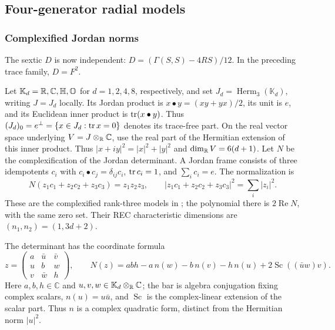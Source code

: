 \subsection{Four-generator radial models}
\label{sec:exceptional-four-generator}

\subsubsection{Complexified Jordan norms}
\label{exc-jordan-models}

The sextic \(D\) is now independent: \(D=(\Gamma(S,S)-4RS)/12\).
In the preceding trace family, \(D=F^2\).


Let \(\mathbb K_d=\mathbb R,\mathbb C,\mathbb H,\mathbb O\) for
\(d=1,2,4,8\), respectively, and set
\(J_d=\operatorname{Herm}_3(\mathbb K_d)\), writing \(J=J_d\) locally.
Its Jordan product is \(x\bullet y=(xy+yx)/2\), its unit is \(e\),
and its Euclidean inner product is \(\operatorname{tr}(x\bullet y)\).
Thus \((J_d)_0=e^\perp=\{x\in J_d:\operatorname{tr} x=0\}\) denotes its trace-free part.
On the real vector space
underlying \(V=J\otimes_{\mathbb R}\mathbb C\), use the real part of
the Hermitian extension of this inner product. Thus
\(|x+iy|^2=|x|^2+|y|^2\) and \(\dim_{\mathbb R}V=6(d+1)\).
Let \(N\) be the complexification
of the Jordan determinant. A Jordan frame consists of three
idempotents \(c_i\) with \(c_i\bullet c_j=\delta_{ij}c_i\),
\(\operatorname{tr} c_i=1\), and \(\sum_i c_i=e\). The normalization is
\[
 N(z_1c_1+z_2c_2+z_3c_3)=z_1z_2z_3,
 \qquad |z_1c_1+z_2c_2+z_3c_3|^2=\sum_i|z_i|^2.
\]
These are the complexified rank-three models in
\cite[Section~6.11.6(iv)]{NadirashviliTkachevVladut14}; the polynomial
there is \(2\operatorname{Re}N\), with the same zero set.
Their REC characteristic dimensions are \((n_1,n_2)=(1,3d+2)\).

The determinant has the coordinate formula
\begin{equation}\label{exc-norm-coordinates}
 z=\begin{pmatrix}
 a&\bar u&\bar v\\ u&b&w\\ v&\bar w&h
 \end{pmatrix},\qquad
 N(z)=abh-a\,n(w)-b\,n(v)-h\,n(u)
       +2\operatorname{Sc}((\bar u w)v).
\end{equation}
Here \(a,b,h\in\mathbb C\) and
\(u,v,w\in\mathbb K_d\otimes_{\mathbb R}\mathbb C\);
the bar is algebra conjugation fixing complex scalars,
\(n(u)=u\bar u\), and \(\operatorname{Sc}\) is the complex-linear
extension of the scalar part. Thus \(n\) is a complex quadratic
form, distinct from the Hermitian norm \(|u|^2\).

